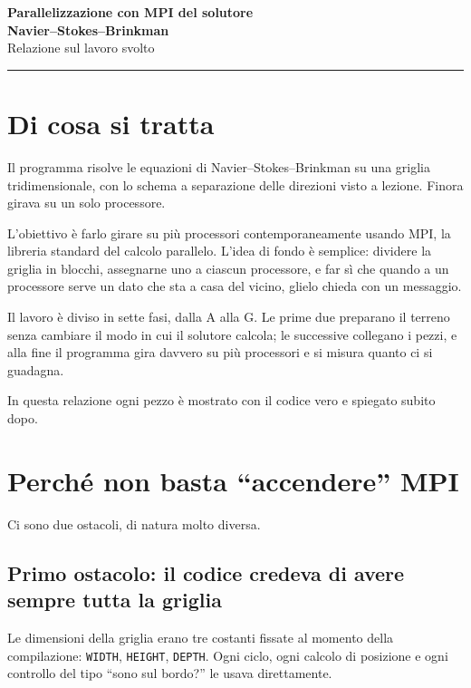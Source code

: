 \documentclass[11pt,a4paper]{article}
\newcommand{\cd}[1]{\texttt{\small #1}}
\begin{document}
\begin{center}
{\LARGE\bfseries\color{scuro} Parallelizzazione con MPI del solutore\\[2pt]
Navier--Stokes--Brinkman}\\[8pt]
{\large Relazione sul lavoro svolto}\\[10pt]
\end{center}

\hrule
\vspace{1.2em}

\section{Di cosa si tratta}

Il programma risolve le equazioni di Navier--Stokes--Brinkman su una griglia
tridimensionale, con lo schema a separazione delle direzioni visto a lezione.
Finora girava su un solo processore.

L'obiettivo è farlo girare su più processori contemporaneamente usando MPI, la
libreria standard del calcolo parallelo. L'idea di fondo è semplice: dividere
la griglia in blocchi, assegnarne uno a ciascun processore, e far sì che quando
a un processore serve un dato che sta a casa del vicino, glielo chieda con un
messaggio.

Il lavoro è diviso in sette fasi, dalla A alla G. Le prime due preparano il
terreno senza cambiare il modo in cui il solutore calcola; le successive
collegano i pezzi, e alla fine il programma gira davvero su più processori e
si misura quanto ci si guadagna.

In questa relazione ogni pezzo è mostrato con il codice vero e spiegato subito
dopo.

\section{Perché non basta ``accendere'' MPI}

Ci sono due ostacoli, di natura molto diversa.

\subsection*{Primo ostacolo: il codice credeva di avere sempre tutta la griglia}

Le dimensioni della griglia erano tre costanti fissate al momento della
compilazione: \cd{WIDTH}, \cd{HEIGHT}, \cd{DEPTH}. Ogni ciclo, ogni calcolo di
posizione e ogni controllo del tipo ``sono sul bordo?'' le usava direttamente.
\end{document}
